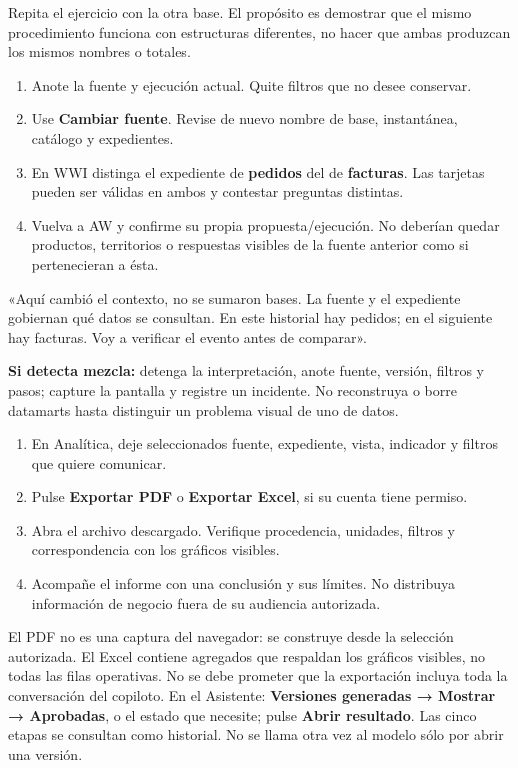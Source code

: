 Repita el ejercicio con la otra base. El propósito es demostrar que el mismo procedimiento funciona con estructuras diferentes, no hacer que ambas produzcan los mismos nombres o totales.
\begin{enumerate}
\item Anote la fuente y ejecución actual. Quite filtros que no desee conservar.
\item Use \textbf{Cambiar fuente}. Revise de nuevo nombre de base, instantánea, catálogo y expedientes.
\item En WWI distinga el expediente de \textbf{pedidos} del de \textbf{facturas}. Las tarjetas pueden ser válidas en ambos y contestar preguntas distintas.
\item Vuelva a AW y confirme su propia propuesta/ejecución. No deberían quedar productos, territorios o respuestas visibles de la fuente anterior como si pertenecieran a ésta.
\end{enumerate}
\begin{good}
«Aquí cambió el contexto, no se sumaron bases. La fuente y el expediente gobiernan qué datos se consultan. En este historial hay pedidos; en el siguiente hay facturas. Voy a verificar el evento antes de comparar».
\end{good}
\textbf{Si detecta mezcla:} detenga la interpretación, anote fuente, versión, filtros y pasos; capture la pantalla y registre un incidente. No reconstruya o borre datamarts hasta distinguir un problema visual de uno de datos.

\begin{enumerate}
\item En Analítica, deje seleccionados fuente, expediente, vista, indicador y filtros que quiere comunicar.
\item Pulse \textbf{Exportar PDF} o \textbf{Exportar Excel}, si su cuenta tiene permiso.
\item Abra el archivo descargado. Verifique procedencia, unidades, filtros y correspondencia con los gráficos visibles.
\item Acompañe el informe con una conclusión y sus límites. No distribuya información de negocio fuera de su audiencia autorizada.
\end{enumerate}
El PDF no es una captura del navegador: se construye desde la selección autorizada. El Excel contiene agregados que respaldan los gráficos visibles, no todas las filas operativas. No se debe prometer que la exportación incluya toda la conversación del copiloto.
En el Asistente: \textbf{Versiones generadas → Mostrar → Aprobadas}, o el estado que necesite; pulse \textbf{Abrir resultado}. Las cinco etapas se consultan como historial. No se llama otra vez al modelo sólo por abrir una versión.

